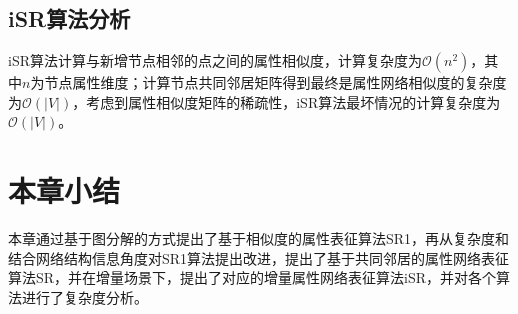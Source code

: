 \subsection{iSR算法分析}
iSR算法计算与新增节点相邻的点之间的属性相似度，计算复杂度为$\mathcal{O}(n^2)$，其中$n$为节点属性维度；计算节点共同邻居矩阵得到最终是属性网络相似度的复杂度为$\mathcal{O}(|V|)$，考虑到属性相似度矩阵的稀疏性，iSR算法最坏情况的计算复杂度为$\mathcal{O}(|V|)$。
\section{本章小结}
本章通过基于图分解的方式提出了基于相似度的属性表征算法SR1，再从复杂度和结合网络结构信息角度对SR1算法提出改进，提出了基于共同邻居的属性网络表征算法SR，并在增量场景下，提出了对应的增量属性网络表征算法iSR，并对各个算法进行了复杂度分析。